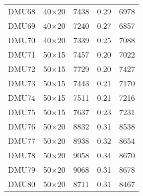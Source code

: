 \begin{table}[H]
\begin{tabular}{@{}ccccc@{}}
DMU68 & 40$\times$20 & 7438 & 0.29 & 6978\\ 
DMU69 & 40$\times$20 & 7240 & 0.27 & 6857\\ 
DMU70 & 40$\times$20 & 7339 & 0.25 & 7088\\ 
DMU71 & 50$\times$15 & 7457 & 0.20 & 7022\\ 
DMU72 & 50$\times$15 & 7729 & 0.20 & 7427\\ 
DMU73 & 50$\times$15 & 7443 & 0.21 & 7170\\ 
DMU74 & 50$\times$15 & 7511 & 0.21 & 7216\\ 
DMU75 & 50$\times$15 & 7637 & 0.23 & 7231\\ 
DMU76 & 50$\times$20 & 8832 & 0.31 & 8538\\ 
DMU77 & 50$\times$20 & 8938 & 0.32 & 8654\\ 
DMU78 & 50$\times$20 & 9058 & 0.34 & 8670\\ 
DMU79 & 50$\times$20 & 9068 & 0.31 & 8678\\ 
DMU80 & 50$\times$20 & 8711 & 0.31 & 8467\\ \bottomrule
\end{tabular}
\end{table}
